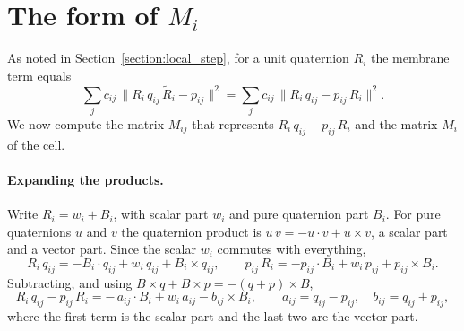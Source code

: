 \documentclass{birkjour}
\theoremstyle{remark}
\numberwithin{equation}{section}
\begin{document}
 \section{The form of $M_i$}
 \label{section:the_form_of_arap_matrix}

As noted in Section~\ref{section:local_step}, for a unit quaternion $R_i$ the membrane term equals
\begin{equation*}
\sum_j c_{ij} \, \| R_i \, q_{ij} \, \tilde R_i - p_{ij} \|^2 = \sum_j c_{ij} \, \| R_i \, q_{ij} - p_{ij} \, R_i \|^2 .
\end{equation*}
We now compute the matrix $M_{ij}$ that represents $R_i \, q_{ij} - p_{ij} \, R_i$ and the matrix $M_i$ of the cell.

\paragraph{Expanding the products.} Write $R_i = w_i + B_i$, with scalar part $w_i$ and pure quaternion part $B_i$. For pure quaternions $u$ and $v$ the quaternion product is $u \, v = -u \cdot v + u \times v$, a scalar part and a vector part. Since the scalar $w_i$ commutes with everything,
\begin{equation*}
R_i \, q_{ij} = -B_i \cdot q_{ij} + w_i \, q_{ij} + B_i \times q_{ij},
\qquad
p_{ij} \, R_i = -p_{ij} \cdot B_i + w_i \, p_{ij} + p_{ij} \times B_i .
\end{equation*}
Subtracting, and using $B \times q + B \times p = -(q + p) \times B$,
\begin{equation}
     R_i \, q_{ij} - p_{ij} \, R_i = -\, a_{ij} \cdot B_i + w_i \, a_{ij} - b_{ij} \times B_i ,
     \qquad a_{ij} = q_{ij} - p_{ij}, \quad b_{ij} = q_{ij} + p_{ij},
\end{equation}
where the first term is the scalar part and the last two are the vector part.
\end{document}
